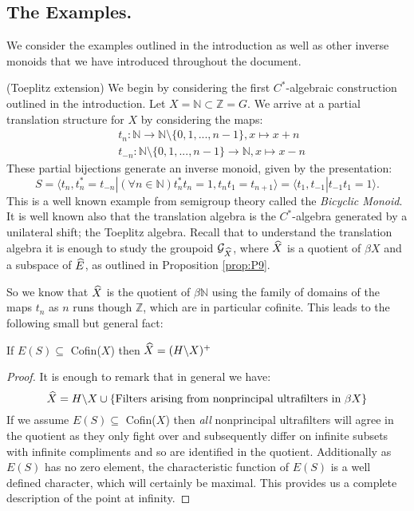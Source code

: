 \subsection{The Examples.}
We consider the examples outlined in the introduction as well as other inverse monoids that we have introduced throughout the document. 
\begin{example}\label{Ex:Toe}(Toeplitz extension)
We begin by considering the first $C^{*}$-algebraic construction outlined in the introduction. Let $X=\mathbb{N} \subset \mathbb{Z}=G$. We arrive at a partial translation structure for $X$ by considering the maps:
\begin{eqnarray*}
& t_{n}: \mathbb{N} \rightarrow \mathbb{N}\setminus \lbrace 0,1,...,n-1 \rbrace, x \mapsto x+n \\
&t_{-n}: \mathbb{N}\setminus \lbrace 0,1,...,n-1 \rbrace \rightarrow \mathbb{N} , x \mapsto x-n
\end{eqnarray*} 
These partial bijections generate an inverse monoid, given by the presentation:
\begin{equation*}
S=\langle t_{n},t_{n}^{*}=t_{-n} | (\forall n \in \mathbb{N}) t_{n}^{*}t_{n}=1, t_{n}t_{1}=t_{n+1} \rangle = \langle t_{1},t_{-1} | t_{-1}t_{1}=1 \rangle.
\end{equation*}
This is a well known example from semigroup theory called the \textit{Bicyclic Monoid}. It is well known also that the translation algebra is the $C^{*}$-algebra generated by a unilateral shift; the Toeplitz algebra. Recall that to understand the translation algebra it is enough to study the groupoid $\mathcal{G}_{\widehat{X}}$, where $\widehat{X}$ is a quotient of $\beta X$ and a subspace of $\widehat{E}$, as outlined in Proposition \ref{prop:P9}.

So we know that $\widehat{X}$ is the quotient of $\beta \mathbb{N}$ using the family of domains of the maps $t_{n}$ as $n$ runs though $\mathbb{Z}$, which are in particular cofinite. This leads to the following small but general fact:

\begin{claim}\label{prop:example}
If $E(S) \subseteq $ Cofin($X$) then $\widehat{X} = (H \backslash X)^{+}$   
\end{claim}
\begin{proof}
It is enough to remark that in general we have:
\begin{equation*}
\widehat{X} = H\backslash X \cup \lbrace \mbox{Filters arising from nonprincipal ultrafilters in } \beta X \rbrace
\end{equation*} If we assume $E(S) \subseteq $ Cofin($X$) then \textit{all} nonprincipal ultrafilters will agree in the quotient as they only fight over and subsequently differ on infinite subsets with infinite compliments and so are identified in the quotient. Additionally as $E(S)$ has no zero element, the characteristic function of $E(S)$ is a well defined character, which will certainly be maximal. This provides us a complete description of the point at infinity.
\end{proof}


\end{example}
